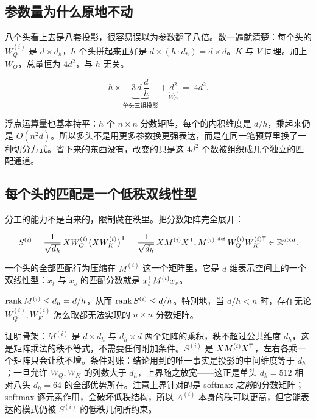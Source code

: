 \subsection{参数量为什么原地不动}

八个头看上去是八套投影，很容易误以为参数翻了八倍。数一遍就清楚：每个头的 \(W_Q^{(i)}\) 是 \(d\times d_h\)，\(h\) 个头拼起来正好是 \(d\times (h\cdot d_h)=d\times d\)。\(K\) 与 \(V\) 同理。加上 \(W_O\)，总量恒为 \(4d^2\)，与 \(h\) 无关。

\[
h \times \underbrace{3\,d\,\frac{d}{h}}_{\text{单头三组投影}} + \underbrace{d^2}_{W_O} \;=\; 4d^2 .
\]

浮点运算量也基本持平：\(h\) 个 \(n\times n\) 分数矩阵，每个的内积维度是 \(d/h\)，乘起来仍是 \(O(n^2 d)\)。所以多头不是用更多参数换更强表达，而是在同一笔预算里换了一种切分方式。省下来的东西没有，改变的只是这 \(4d^2\) 个数被组织成几个独立的匹配通道。

\subsection{每个头的匹配是一个低秩双线性型}

分工的能力不是白来的，限制藏在秩里。把分数矩阵完全展开：

\[
S^{(i)} = \frac{1}{\sqrt{d_h}}\,X W_Q^{(i)} \bigl(X W_K^{(i)}\bigr)^{\mathsf{T}}
        = \frac{1}{\sqrt{d_h}}\,X M^{(i)} X^{\mathsf{T}},
\space M^{(i)} \stackrel{\text{\tiny def}}{=} W_Q^{(i)} W_K^{(i)\mathsf{T}} \in \mathbb{R}^{d\times d}.
\]

一个头的全部匹配行为压缩在 \(M^{(i)}\) 这一个矩阵里，它是 \(d\) 维表示空间上的一个双线性型：\(x_t\) 与 \(x_s\) 的匹配分数就是 \(x_t^{\mathsf{T}}M^{(i)}x_s\)。

\begin{proposition}
\(\operatorname{rank} M^{(i)}\le d_h = d/h\)，从而 \(\operatorname{rank} S^{(i)}\le d/h\)。特别地，当 \(d/h < n\) 时，存在无论 \(W_Q^{(i)},W_K^{(i)}\) 怎么取都无法实现的 \(n\times n\) 分数矩阵。
\end{proposition}

证明骨架：\(M^{(i)}\) 是 \(d\times d_h\) 与 \(d_h\times d\) 两个矩阵的乘积，秩不超过公共维度 \(d_h\)，这是矩阵乘法的秩不等式，不需要任何附加条件。\(S^{(i)}\) 是 \(X M^{(i)} X^{\mathsf{T}}\)，左右各乘一个矩阵只会让秩不增。条件对账：结论用到的唯一事实是投影的中间维度等于 \(d_h\)；一旦允许 \(W_Q,W_K\) 的列数大于 \(d_h\)，上界随之放宽——这正是单头 \(d_k=512\) 相对八头 \(d_h=64\) 的全部优势所在。注意上界针对的是 softmax \emph{之前}的分数矩阵；softmax 逐元素作用，会破坏低秩结构，所以 \(A^{(i)}\) 本身的秩可以更高，但它能表达的模式仍被 \(S^{(i)}\) 的低秩几何所约束。

